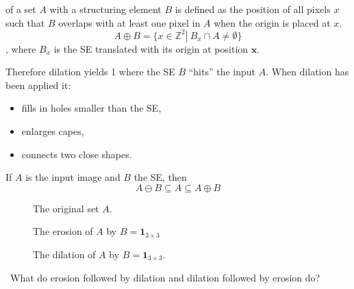 \documentclass[a4paper]{article}
\begin{document}
\begin{definition}
 of a set $A$ with a structuring
element $B$ is defined as the position of all
pixels $x$ such that $B$ overlaps with at least
one pixel in $A$ when the origin is placed
at $x$.
\begin{equation}
    A \oplus B = \{x \in \mathbb{Z}^2 \left|\ B_x \cap A \neq \emptyset \right. \}
\end{equation}
, where $B_x$ is the SE translated with its origin at position $\textbf{x}$.
\end{definition}
Therefore dilation yields 1 where the SE $B$ ``hits'' the input $A$. When dilation has been applied it:
\begin{itemize}
    \item fills in holes smaller than the SE,
    \item enlarges capes,
    \item connects two close shapes.
\end{itemize}
\begin{corollary}
If $A$ is the input image and $B$ the SE, then
\[
A \ominus B \subseteq A \subseteq A \oplus B
\]
\end{corollary}


\begin{multicols}{3}
\begin{figure}[H]
    \centering
    
    \caption{The original set $A$.}
\end{figure}
\begin{figure}[H]
    \centering
    
    \caption{The erosion of $A$ by $B=\textbf{1}_{3\times 3}$}
\end{figure}
\begin{figure}[H]
    \centering
    
    \caption{The dilation of $A$ by $B=\textbf{1}_{3\times 3}$.}
\end{figure}
\end{multicols}

\faQuestionCircle\ What do erosion followed by dilation and dilation followed by erosion do? 
\end{document}
